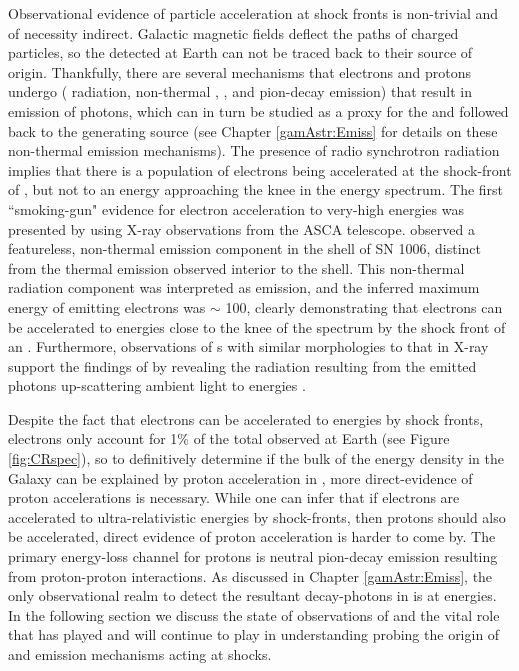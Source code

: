 Observational evidence of particle acceleration at \snr{} shock fronts is non-trivial and of necessity indirect. Galactic magnetic fields deflect the paths of charged particles, so the \crs{} detected at Earth can not be traced back to their source of origin. Thankfully, there are several mechanisms that electrons and protons undergo (\ie{} \sync{} radiation, non-thermal \brems{}, \ic{}, and pion-decay emission) that result in emission of photons, which can in turn be studied as a proxy for the \crs{} and followed back to the generating source (see Chapter \ref{gamAstr:Emiss} for details on these non-thermal emission mechanisms). The presence of radio synchrotron radiation implies that there is a population of electrons being accelerated at the shock-front of \snrs{}, but not to an energy approaching the knee in the \cray{} energy spectrum. The first ``smoking-gun" evidence for electron acceleration to very-high energies was presented by \cite{Koyama95} using X-ray observations from the ASCA telescope. \cite{Koyama95} observed a featureless, non-thermal emission component in the shell of SN 1006, distinct from the thermal emission observed interior to the shell. This non-thermal radiation component was interpreted as \sync{} emission, and the inferred maximum energy of emitting electrons was $\sim $ 100\tev{}, clearly demonstrating that electrons can be accelerated to \cray{} energies close to the knee of the \cray{} spectrum by the shock front of an \snr{}. Furthermore,  \snr{} observations of \tev{}  \gam{}s with similar morphologies to that in X-ray support the findings of \cite{Koyama95} by revealing the \ic{} radiation resulting from the \sync{} emitted photons up-scattering ambient light to \tev{} energies \cite{Tanimori98,Aharonian04}.

Despite the fact that electrons can be accelerated to \cray{} energies by \snr{} shock fronts, electrons only account for 1\% of the total \crs{} observed at Earth (see Figure \ref{fig:CRspec}), so to definitively determine if the bulk of the \cray{} energy density in the Galaxy can be explained by \cray{} proton acceleration in \snrs{}, more direct-evidence of proton accelerations is necessary. While one can infer that if electrons are accelerated to ultra-relativistic energies by \snr{} shock-fronts, then protons should also be accelerated, direct evidence of proton acceleration is harder to come by. The primary energy-loss channel for protons is neutral pion-decay emission resulting from proton-proton interactions. As discussed in Chapter \ref{gamAstr:Emiss}, the only observational realm to detect the resultant decay-photons in is at \gam{} energies. In the following section we discuss the state of \gam{} observations of \snrs{} and the vital role that \Fermi{} has played and will continue to play in understanding probing the origin of \crs{ }and emission mechanisms acting at \snr{} shocks.


